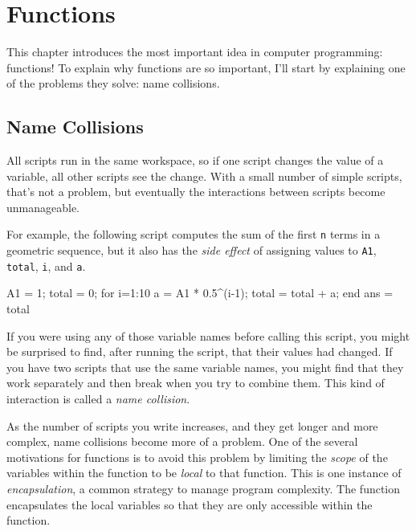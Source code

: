 \chapter{Functions}
\label{functions}


This chapter introduces the most important idea in computer programming: \mbox{functions}!
To explain why functions are so important, I'll start by explaining one of the problems they solve: name collisions.


\section{Name Collisions}
\label{collision}


All scripts run in the same workspace, so if one script changes the value of a variable, all other scripts see the change.  With a small number of simple scripts, that's not a problem, but eventually the interactions between scripts become unmanageable.

For example, the following script computes the
sum of the first \lstinline{n} terms in a geometric sequence, but it also
has the {\em side effect} of assigning values to \lstinline{A1}, \lstinline{total},
\lstinline{i}, and \lstinline{a}.

\begin{code}
A1 = 1;
total = 0;
for i=1:10
    a = A1 * 0.5^(i-1);
    total = total + a;
end
ans = total
\end{code}

If you were using any of those variable names before calling this
script, you might be surprised to find, after running the script,
that their values had changed.  If you have two scripts that use
the same variable names, you might find that they work separately
and then break when you try to combine them.  This kind of
interaction is called a \emph{name collision}.


As the number of scripts you write increases, and they get longer
and more complex, name collisions become more of a problem.  One of the several motivations for functions is to avoid this problem by limiting the \emph{scope} of the variables within the function to be \emph{local} to that function.  This is one instance of \emph{encapsulation}, a common strategy to manage program complexity.  The function encapsulates the local variables so that they are only accessible within the function.


